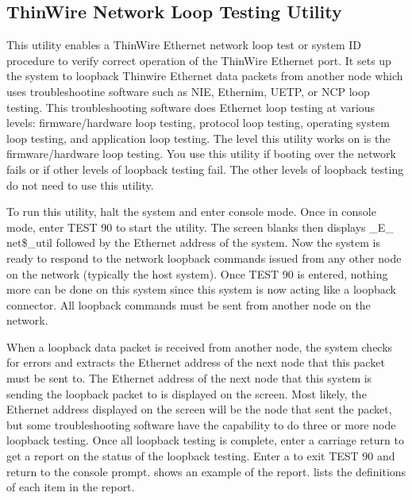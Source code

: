 \subsection{ThinWire Network Loop Testing Utility}

This utility enables a ThinWire Ethernet network loop test or system ID
procedure to verify correct operation of the ThinWire Ethernet port. It sets
up the system to loopback Thinwire Ethernet data packets from another
node which uses troubleshootine software such as NIE, Ethernim, UETP, or
NCP loop testing. This troubleshooting software does Ethernet loop testing
at various levels: firmware/hardware loop testing, protocol loop testing,
operating system loop testing, and application loop testing. The level this
utility works on is the firmware/hardware loop testing. You use this utility
if booting over the network fails or if other levels of loopback testing fail.
The other levels of loopback testing do not need to use this utility.

To run this utility, halt the system and enter console mode. Once in console
mode, enter TEST 90 to start the utility. The screen blanks then displays \_E\_
net\$\_util followed by the Ethernet address of the system. Now the system
is ready to respond to the network loopback commands issued from any
other node on the network (typically the host system). Once TEST 90 is
entered, nothing more can be done on this system since this system is now
acting like a loopback connector. All loopback commands must be sent
from another node on the network.

When a loopback data packet is received from another node, the system
checks for errors and extracts the Ethernet address of the next node that
this packet must be sent to. The Ethernet address of the next node that
this system is sending the loopback packet to is displayed on the screen.
Most likely, the Ethernet address displayed on the screen will be the node
that sent the packet, but some troubleshooting software have the capability
to do three or more node loopback testing. Once all loopback testing is
complete, enter a carriage return to get a report on the status of the loopback
testing. Enter a  to exit TEST 90 and return to the console prompt.
 shows an example of the report.  lists the definitions
of each item in the report.

